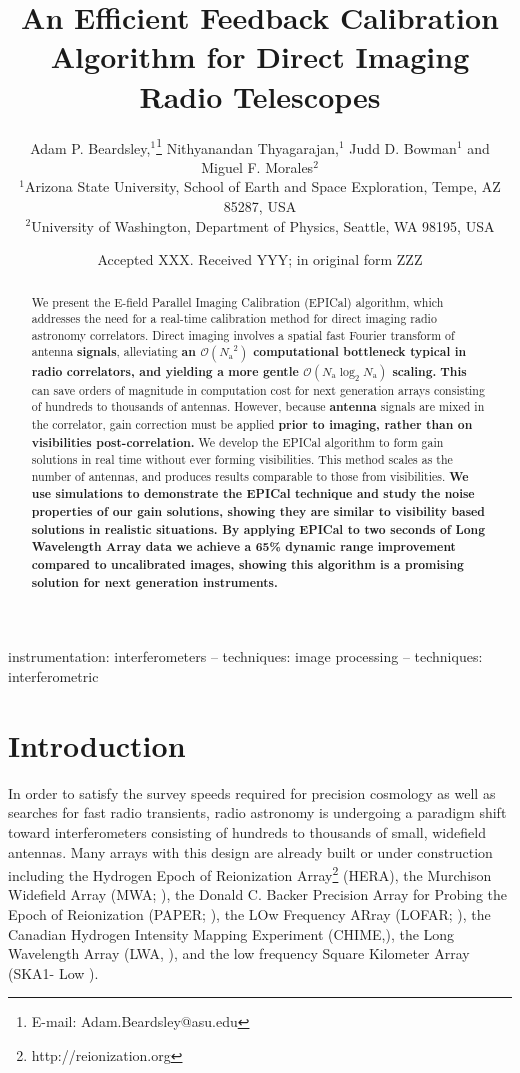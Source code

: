 \documentclass[a4paper,fleqn,usenatbib]{../mnras}
\title[EPICal]{An Efficient Feedback Calibration Algorithm for Direct Imaging Radio Telescopes
}
\author[Beardsley et al.]{
Adam P. Beardsley,$^{1}$\thanks{E-mail: Adam.Beardsley@asu.edu}
Nithyanandan Thyagarajan,$^{1}$
Judd D. Bowman$^{1}$
\newauthor
and Miguel F. Morales$^{2}$
\\
$^{1}$Arizona State University, School of Earth and Space Exploration, Tempe, AZ 85287, USA\\
$^{2}$University of Washington, Department of Physics, Seattle, WA 98195, USA\\
}
\date{Accepted XXX. Received YYY; in original form ZZZ}
\newcommand{\Nant}{\ensuremath{N_{\mathrm{a}}}}
\begin{document}
\label{firstpage}
\pagerange{\pageref{firstpage}--\pageref{lastpage}}
\maketitle

\begin{abstract}
We present the E-field Parallel Imaging Calibration (EPICal) algorithm, which addresses the 
need for a real-time calibration method for direct imaging radio astronomy correlators. Direct 
imaging involves a spatial fast Fourier transform of antenna \textbf{signals}, alleviating 
\textbf{an 
$\mathcal{O}(\Nant^2)$ computational bottleneck typical in radio correlators, and yielding a more gentle $\mathcal{O}(\Nant \log_2 
\Nant)$ scaling.} \textbf{This} can save orders of magnitude in computation cost for next generation arrays 
consisting of hundreds to thousands of antennas. However, because \textbf{antenna} signals are mixed in the 
correlator, gain correction must be applied \textbf{prior to imaging, rather than on visibilities post-correlation.} We develop the EPICal algorithm 
to form gain solutions in real time without ever forming visibilities. This method scales as the 
number of antennas, and produces results comparable to those from visibilities. 
\textbf{We use simulations to demonstrate the EPICal technique and study the noise properties of
our gain solutions, showing they are similar to visibility based solutions in realistic 
situations.
By applying EPICal to two seconds of Long Wavelength Array data we achieve a 65\% dynamic range
improvement compared to uncalibrated images, showing this algorithm is a promising
solution for next generation instruments.}
\end{abstract}

\begin{keywords}
instrumentation: interferometers -- techniques: image processing -- techniques: interferometric
\end{keywords}



\section{Introduction}
In order to satisfy the survey speeds required for precision cosmology as well as searches for 
fast radio transients, radio astronomy is undergoing a paradigm shift toward interferometers 
consisting of hundreds to thousands of small, widefield antennas. Many arrays with this design 
are already built or under construction including the Hydrogen Epoch of Reionization 
Array\footnote{http://reionization.org} (HERA), the Murchison Widefield Array (MWA; 
\citealt{tin13,bow13}), the Donald C. Backer Precision Array for Probing the Epoch of 
Reionization (PAPER; \citealt{par10}), the LOw Frequency ARray (LOFAR; \citealt{van13}), the 
Canadian Hydrogen Intensity Mapping Experiment (CHIME,\citealt{ban14}), the Long 
Wavelength Array (LWA, \citealt{ell13}), and the low frequency Square Kilometer Array (SKA1-
Low \citealt{mel13}).
\end{document}
